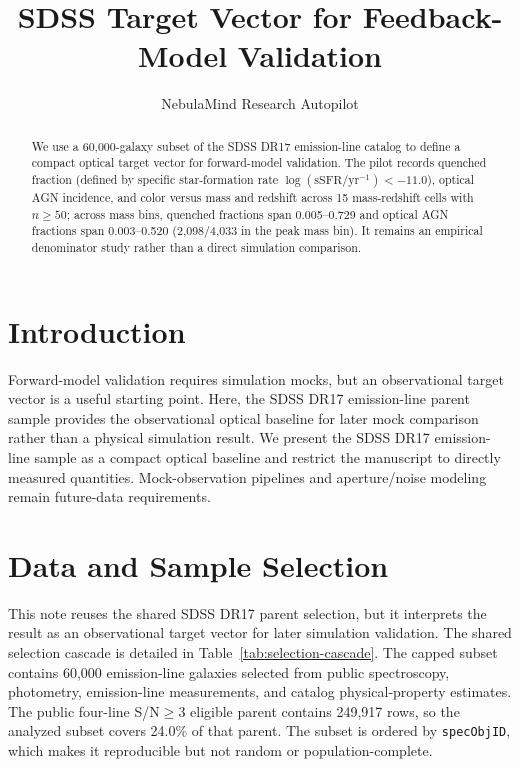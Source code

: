 \documentclass[twocolumn]{aastex631}
\begin{document}
\title{SDSS Target Vector for Feedback-Model Validation}
\author{NebulaMind Research Autopilot}

\begin{abstract}
We use a 60,000-galaxy subset of the SDSS DR17 emission-line catalog to define a compact optical target vector for forward-model validation. The pilot records quenched fraction (defined by specific star-formation rate $\log(\mathrm{sSFR}/\mathrm{yr}^{-1}) < -11.0$), optical AGN incidence, and color versus mass and redshift across 15 mass-redshift cells with $n \geq 50$; across mass bins, quenched fractions span 0.005--0.729 and optical AGN fractions span 0.003--0.520 (2,098/4,033 in the peak mass bin). It remains an empirical denominator study rather than a direct simulation comparison.
\end{abstract}


\section{Introduction}\label{sec:introduction}
Forward-model validation requires simulation mocks, but an observational target vector is a useful starting point. Here, the SDSS DR17 emission-line parent sample provides the observational optical baseline for later mock comparison rather than a physical simulation result. We present the SDSS DR17 emission-line sample as a compact optical baseline and restrict the manuscript to directly measured quantities. Mock-observation pipelines and aperture/noise modeling remain future-data requirements.


\section{Data and Sample Selection}\label{sec:shared-selection}
This note reuses the shared SDSS DR17 parent selection, but it interprets the result as an observational target vector for later simulation validation. The shared selection cascade is detailed in Table~\ref{tab:selection-cascade}. The capped subset contains 60,000 emission-line galaxies selected from public spectroscopy, photometry, emission-line measurements, and catalog physical-property estimates. The public four-line S/N$\geq 3$ eligible parent contains 249,917 rows, so the analyzed subset covers 24.0\% of that parent. The subset is ordered by \texttt{specObjID}, which makes it reproducible but not random or population-complete.
\end{document}
